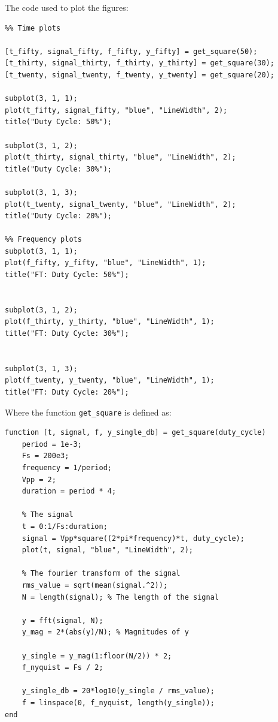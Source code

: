 The code used to plot the figures:
\newpage
\begin{verbatim}
%% Time plots

[t_fifty, signal_fifty, f_fifty, y_fifty] = get_square(50);
[t_thirty, signal_thirty, f_thirty, y_thirty] = get_square(30);
[t_twenty, signal_twenty, f_twenty, y_twenty] = get_square(20);

subplot(3, 1, 1);
plot(t_fifty, signal_fifty, "blue", "LineWidth", 2);
title("Duty Cycle: 50%");

subplot(3, 1, 2);
plot(t_thirty, signal_thirty, "blue", "LineWidth", 2);
title("Duty Cycle: 30%");

subplot(3, 1, 3);
plot(t_twenty, signal_twenty, "blue", "LineWidth", 2);
title("Duty Cycle: 20%");

%% Frequency plots
subplot(3, 1, 1);
plot(f_fifty, y_fifty, "blue", "LineWidth", 1);
title("FT: Duty Cycle: 50%");


subplot(3, 1, 2);
plot(f_thirty, y_thirty, "blue", "LineWidth", 1);
title("FT: Duty Cycle: 30%");


subplot(3, 1, 3);
plot(f_twenty, y_twenty, "blue", "LineWidth", 1);
title("FT: Duty Cycle: 20%");
\end{verbatim}
Where the function \texttt{get\_square} is defined as:
\newpage
\begin{verbatim}
function [t, signal, f, y_single_db] = get_square(duty_cycle)
    period = 1e-3;
    Fs = 200e3;
    frequency = 1/period;
    Vpp = 2;
    duration = period * 4;
    
    % The signal
    t = 0:1/Fs:duration;
    signal = Vpp*square((2*pi*frequency)*t, duty_cycle);
    plot(t, signal, "blue", "LineWidth", 2);
    
    % The fourier transform of the signal
    rms_value = sqrt(mean(signal.^2));
    N = length(signal); % The length of the signal
    
    y = fft(signal, N);
    y_mag = 2*(abs(y)/N); % Magnitudes of y
    
    y_single = y_mag(1:floor(N/2)) * 2;
    f_nyquist = Fs / 2;
    
    y_single_db = 20*log10(y_single / rms_value);
    f = linspace(0, f_nyquist, length(y_single));
end
\end{verbatim}